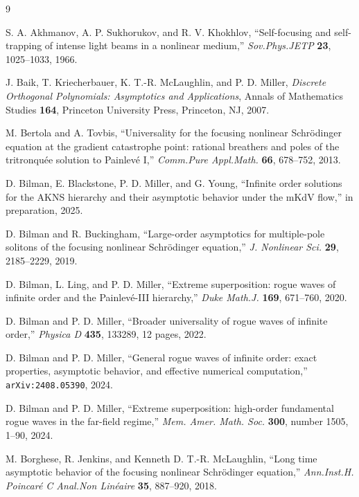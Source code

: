 \documentclass[12pt]{amsart}
\numberwithin{equation}{section}
\begin{document}
\begin{thebibliography}{9}

S. A. Akhmanov, A. P. Sukhorukov, and R. V. Khokhlov, ``Self-focusing and self-trapping of intense light beams in a nonlinear medium,'' \textit{Sov.\@ Phys.\@ JETP} \textbf{23},
1025--1033, 1966.

J. Baik, T. Kriecherbauer, K. T.-R. McLaughlin, and P. D. Miller, \textit{Discrete Orthogonal Polynomials:  Asymptotics and Applications}, Annals of Mathematics Studies \textbf{164}, Princeton University Press, Princeton, NJ, 2007.

M. Bertola and A. Tovbis, 
``Universality for the focusing nonlinear Schr\"odinger equation at the
   gradient catastrophe point: rational breathers and poles of the 
   tritronqu\'ee solution to Painlev\'e I,''
\textit{Comm.\@ Pure Appl.\@ Math.\@}
\textbf{66}, 
678--752, 2013.

D. Bilman, E. Blackstone, P. D. Miller, and G. Young,
``Infinite order solutions for the AKNS hierarchy and their asymptotic behavior under the mKdV flow,''
in preparation, 2025.

D. Bilman and R. Buckingham,
``Large-order asymptotics for multiple-pole solitons of the focusing nonlinear Schr\"odinger equation,''
\textit{J. Nonlinear Sci.} \textbf{29}, 2185--2229, 2019.


D. Bilman, L. Ling, and P. D. Miller, 
``Extreme superposition:  rogue waves of infinite order and the Painlev\'e-III hierarchy,'' 
\textit{Duke Math.\@ J.} \textbf{169}, 671--760, 2020.

D. Bilman and P. D. Miller, 
``Broader universality of rogue waves of infinite order,''
\textit{Physica D} \textbf{435}, 133289, 12 pages, 2022.


D. Bilman and P. D. Miller, 
``General rogue waves of infinite order: exact properties, asymptotic behavior, and effective numerical computation,'' 
\texttt{arXiv:2408.05390}, 2024.

D. Bilman and P. D. Miller, 
``Extreme superposition: high-order fundamental rogue waves in the far-field regime,''
\textit{Mem. Amer. Math. Soc.} \textbf{300}, number 1505, 1--90, 2024.

M. Borghese, 
R. Jenkins, and 
Kenneth D. T.-R. McLaughlin, 
``Long time asymptotic behavior of the focusing nonlinear Schr\"odinger
   equation,''
\textit{Ann.\@ Inst.\@ H. Poincar\'e C  Anal.\@ Non Lin\'eaire}
\textbf{35}, 887--920, 2018.


\end{thebibliography}
\end{document}
